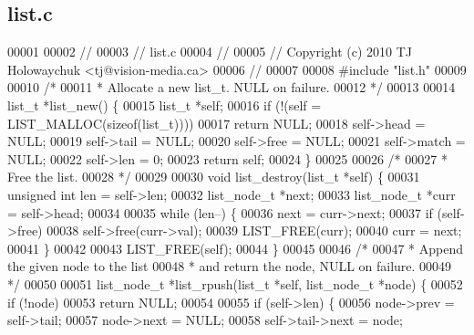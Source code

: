 \subsection{list.\+c}
\label{list_8c_source}

\begin{DoxyCode}
00001 
00002 \textcolor{comment}{//}
00003 \textcolor{comment}{// list.c}
00004 \textcolor{comment}{//}
00005 \textcolor{comment}{// Copyright (c) 2010 TJ Holowaychuk <tj@vision-media.ca>}
00006 \textcolor{comment}{//}
00007 
00008 \textcolor{preprocessor}{#include "list.h"}
00009 
00010 \textcolor{comment}{/*}
00011 \textcolor{comment}{ * Allocate a new list\_t. NULL on failure.}
00012 \textcolor{comment}{ */}
00013 
00014 list_t *list_new() \{
00015   list_t *\textcolor{keyword}{self};
00016   \textcolor{keywordflow}{if} (!(\textcolor{keyword}{self} = LIST_MALLOC(\textcolor{keyword}{sizeof}(list_t))))
00017     \textcolor{keywordflow}{return} NULL;
00018   \textcolor{keyword}{self}->head = NULL;
00019   \textcolor{keyword}{self}->tail = NULL;
00020   \textcolor{keyword}{self}->free = NULL;
00021   \textcolor{keyword}{self}->match = NULL;
00022   \textcolor{keyword}{self}->len = 0;
00023   \textcolor{keywordflow}{return} \textcolor{keyword}{self};
00024 \}
00025 
00026 \textcolor{comment}{/*}
00027 \textcolor{comment}{ * Free the list.}
00028 \textcolor{comment}{ */}
00029 
00030 \textcolor{keywordtype}{void} list_destroy(list_t *\textcolor{keyword}{self}) \{
00031   \textcolor{keywordtype}{unsigned} \textcolor{keywordtype}{int} len = \textcolor{keyword}{self}->len;
00032   list_node_t *next;
00033   list_node_t *curr = \textcolor{keyword}{self}->head;
00034 
00035   \textcolor{keywordflow}{while} (len--) \{
00036     next = curr->next;
00037     \textcolor{keywordflow}{if} (self->free)
00038       \textcolor{keyword}{self}->free(curr->val);
00039     LIST_FREE(curr);
00040     curr = next;
00041   \}
00042 
00043   LIST_FREE(\textcolor{keyword}{self});
00044 \}
00045 
00046 \textcolor{comment}{/*}
00047 \textcolor{comment}{ * Append the given node to the list}
00048 \textcolor{comment}{ * and return the node, NULL on failure.}
00049 \textcolor{comment}{ */}
00050 
00051 list_node_t *list_rpush(list_t *\textcolor{keyword}{self}, list_node_t *node) \{
00052   \textcolor{keywordflow}{if} (!node)
00053     \textcolor{keywordflow}{return} NULL;
00054 
00055   \textcolor{keywordflow}{if} (self->len) \{
00056     node->prev = \textcolor{keyword}{self}->tail;
00057     node->next = NULL;
00058     \textcolor{keyword}{self}->tail->next = node;

\end{DoxyCode}
